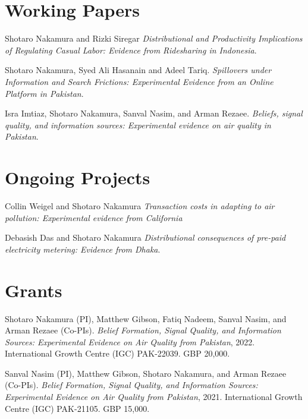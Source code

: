 \documentclass[10pt]{res} %
\begin{document}
\begin{resume}
		\section{Working Papers}
		
		
		\hangindent=0.7cm Shotaro Nakamura and Rizki Siregar \textit{Distributional and Productivity Implications of Regulating Casual Labor: Evidence from Ridesharing in Indonesia}. 
		
		\hangindent=0.7cm Shotaro Nakamura, Syed Ali Hasanain and Adeel Tariq. \textit{Spillovers under Information and Search Frictions: Experimental Evidence from an Online Platform in Pakistan}. 
		
		\hangindent=0.7cm Isra Imtiaz, Shotaro Nakamura, Sanval Nasim, and Arman Rezaee. \textit{Beliefs, signal quality, and information sources: Experimental evidence on air quality in Pakistan}.
		
		\section{Ongoing Projects}
		\hangindent=0.7cm Collin Weigel and Shotaro Nakamura \textit{Transaction costs in adapting to air pollution: Experimental evidence from California}
		
		\hangindent=0.7cm Debasish Das and Shotaro Nakamura \textit{Distributional consequences of pre-paid electricity metering: Evidence from Dhaka}.
		\section{Grants} 
		\hangindent=0.7cm  Shotaro Nakamura (PI), Matthew Gibson, Fatiq Nadeem, Sanval Nasim, and Arman Rezaee (Co-PIs). \textit{Belief Formation, Signal Quality, and Information Sources: Experimental Evidence on Air Quality from Pakistan}, 2022. International Growth Centre (IGC) PAK-22039. GBP 20,000. 
		
		\hangindent=0.7cm  Sanval Nasim (PI), Matthew Gibson, Shotaro Nakamura, and Arman Rezaee (Co-PIs). \textit{Belief Formation, Signal Quality, and Information Sources: Experimental Evidence on Air Quality from Pakistan}, 2021. International Growth Centre (IGC) PAK-21105. GBP 15,000. 
		

\end{resume}
\end{document}
